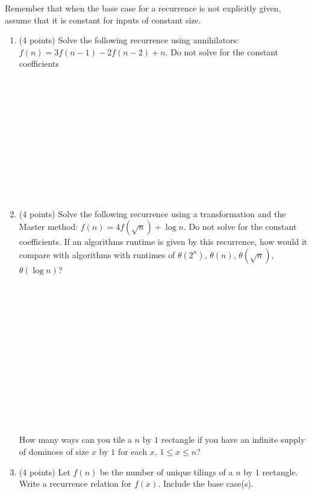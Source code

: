 \documentclass[11pt]{article}
\begin{document}
\begin{enumerate}
 
 
 
 Remember that when the base case for a recurrence is not explicitly given, assume that it is constant for inputs of constant size.
 
 \begin{enumerate}
 
 \item (4 points) Solve the following recurrence using annihilators: $f(n) = 3f(n-1) - 2f(n-2) + n$.  Do not solve for the constant coefficients
 \ \\ \ \\  \ \\ \ \\ \ \\  \ \\ \ \\ \ \\  \ \\ \ \\ \ \\  \ \\

\item (4 points) Solve the following recurrence using a transformation and the Master method: $f(n) = 4f(\sqrt{n}) + \log n$.  Do not solve for the constant coefficients.  If an algorithms runtime is given by this recurrence, how would it compare with algorithms with runtimes of $\theta(2^{n})$, $\theta(n)$, $\theta(\sqrt{n})$, $\theta(\log n)$?

 \ \\ \ \\  \ \\ \ \\ \ \\  \ \\ \ \\ \ \\  \ \\ \ \\ \ \\  \ \\

\pagebreak

 
 How many ways can you tile a $n$ by $1$ rectangle if you have an infinite supply of dominoes of size $x$ by $1$ for each $x$, $1 \leq x \leq n$?
 
 \item (4 points) Let $f(n)$ be the number of unique tilings of a $n$ by $1$ rectangle.  Write a recurrence relation for $f(x)$.  Include the base case(s).  \\ \ \\ \ \\ \ \\
 

\end{enumerate}
\end{enumerate}
\end{document}
